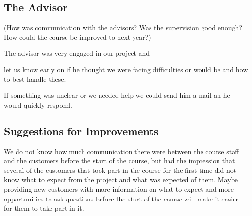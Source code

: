 \subsection{The Advisor}

	(How was communication with the advisors? Was the supervision good enough? 
	How could the course be improved to next year?)

	The advisor was very engaged in our project and 

	let us know early on if he thought we were facing difficulties or would be and how to best handle these.

	If something was unclear or we needed help we could send him a mail an he would quickly respond.

\subsection{Suggestions for Improvements}

	We do not know how much communication there were between the course staff and the customers 
	before the start of the course, but had the impression that several of the customers that 
	took part in the course for the first time did not know what to expect from the project and 
	what was expected of them. Maybe providing new customers with more information on what to expect 
	and more opportunities to ask questions before the start of the course will make it easier for 
	them to take part in it.







	










